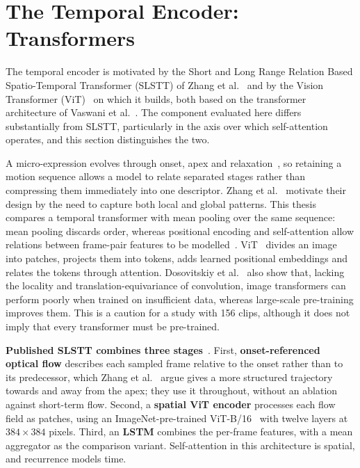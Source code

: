 \section{The Temporal Encoder: Transformers}
\label{sec:transformer-review}

The temporal encoder is motivated by the Short and Long Range Relation Based Spatio-Temporal Transformer (SLSTT) of Zhang et al.~\cite{zhang2022} and by the Vision Transformer (ViT)~\cite{dosovitskiy2021} on which it builds, both based on the transformer architecture of Vaswani et al.~\cite{vaswani2017}. The component evaluated here differs substantially from SLSTT, particularly in the axis over which self-attention operates, and this section distinguishes the two.

A micro-expression evolves through onset, apex and relaxation~\cite{yan2014}, so retaining a motion sequence allows a model to relate separated stages rather than compressing them immediately into one descriptor. Zhang et al.~\cite{zhang2022} motivate their design by the need to capture both local and global patterns. This thesis compares a temporal transformer with mean pooling over the same sequence: mean pooling discards order, whereas positional encoding and self-attention allow relations between frame-pair features to be modelled~\cite{vaswani2017}. ViT~\cite{dosovitskiy2021} divides an image into patches, projects them into tokens, adds learned positional embeddings and relates the tokens through attention. Dosovitskiy et al.~\cite{dosovitskiy2021} also show that, lacking the locality and translation-equivariance of convolution, image transformers can perform poorly when trained on insufficient data, whereas large-scale pre-training improves them. This is a caution for a study with 156 clips, although it does not imply that every transformer must be pre-trained.

\textbf{Published SLSTT combines three stages}~\cite{zhang2022}. First, \textbf{onset-referenced optical flow} describes each sampled frame relative to the onset rather than to its predecessor, which Zhang et al.~\cite{zhang2022} argue gives a more structured trajectory towards and away from the apex; they use it throughout, without an ablation against short-term flow. Second, a \textbf{spatial ViT encoder} processes each flow field as patches, using an ImageNet-pre-trained ViT-B/16~\cite{dosovitskiy2021} with twelve layers at $384 \times 384$ pixels. Third, an \textbf{LSTM} combines the per-frame features, with a mean aggregator as the comparison variant. Self-attention in this architecture is spatial, and recurrence models time.

